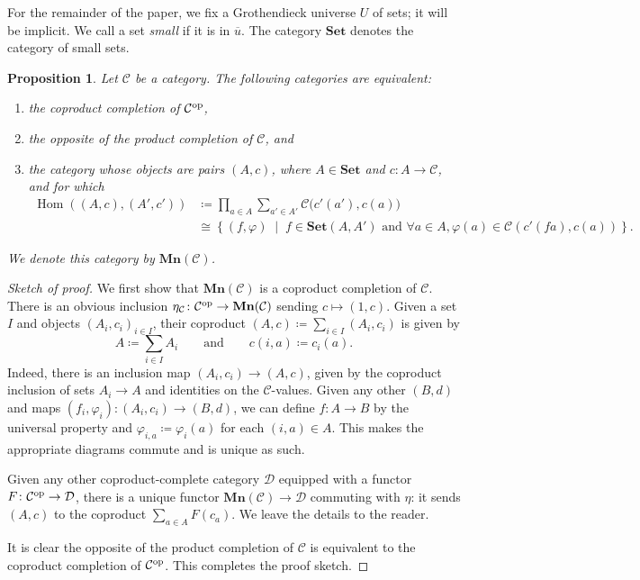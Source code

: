 \documentclass[11pt, one side, article]{memoir}
\theoremstyle{definition}
\theoremstyle{plain}
\newtheorem{proposition}[definitionx]{Proposition}
\DeclareMathOperator{\Hom}{Hom}
\newcommand{\cat}[1]{\mathcal{#1}}%
\newcommand{\Cat}[1]{\mathbf{#1}}%
\newcommand{\op}{^\tn{op}}
\newcommand{\tn}[1]{\textnormal{#1}}
\newcommand{\ol}[1]{\overline{#1}}
\newcommand{\smset}{\Cat{Set}}
\newcommand{\0}{\textsf{0}}
\newcommand{\1}{\tn{\textsf{1}}}
\newcommand{\2}{\tn{\textsf{2}}}
\newcommand{\3}{\tn{\textsf{3}}}
\newcommand{\4}{\tn{\textsf{4}}}
\newcommand{\5}{\tn{\textsf{5}}}
\newcommand{\6}{\tn{\textsf{6}}}
\newcommand{\7}{\tn{\textsf{7}}}
\newcommand{\8}{\tn{\textsf{8}}}
\newcommand{\9}{\tn{\textsf{9}}}
\newcommand{\mn}{\Cat{Mn}}
\newcommand{\qqand}{\qquad\text{and}\qquad}
\begin{document}
For the remainder of the paper, we fix a Grothendieck universe $U$ of sets; it will be implicit. We call a set \emph{small} if it is in $\ol{u}$. The category $\smset$ denotes the category of small sets.

\begin{proposition}
Let $\cat{C}$ be a category. The following categories are equivalent:
\begin{enumerate}
	\item the coproduct completion of $\cat{C}\op$,
	\item the opposite of the product completion of $\cat{C}$, and
	\item the category whose objects are pairs $(A,c)$, where $A\in\smset$ and $c\colon A\to\cat{C}$, and for which
	\begin{align*}
	\Hom((A,c),(A',c'))&\coloneqq\prod_{a\in A}\sum_{a'\in A'}\cat{C}\big(c'(a'),c(a)\big)\\&\cong\left\{(f,\varphi)\;\middle|\; f\in\smset(A,A')\text{ and }\forall a\in A, \varphi(a)\in\cat{C}(c'(fa),c(a))\right\}.
	\end{align*}
\end{enumerate}
We denote this category by $\mn(\cat{C})$.
\end{proposition}
\begin{proof}[Sketch of proof]
We first show that $\mn(\cat{C})$ is a coproduct completion of $\cat{C}$. There is an obvious inclusion $\eta_\cat{C}\colon \cat{C}\op\to\mn(\cat{C})$ sending $c\mapsto (1,c)$. Given a set $I$ and objects $(A_i,c_i)_{i\in I}$, their coproduct $(A,c)\coloneqq\sum_{i\in I}(A_i,c_i)$ is given by
\[
A\coloneqq\sum_{i\in I}A_i
\qqand
c(i,a)\coloneqq c_i(a).
\]
Indeed, there is an inclusion map $(A_i,c_i)\to (A,c)$, given by the coproduct inclusion of sets $A_i\to A$ and identities on the $\cat{C}$-values. Given any other $(B,d)$ and maps $(f_i,\varphi_i)\colon (A_i,c_i)\to(B,d)$, we can define $f\colon A\to B$ by the universal property and $\varphi_{i,a}\coloneqq\varphi_i(a)$ for each $(i,a)\in A$. This makes the appropriate diagrams commute and is unique as such.

Given any other coproduct-complete category $\cat{D}$ equipped with a functor $F\colon\cat{C}\op\to\cat{D}$, there is a unique functor $\mn(\cat{C})\to\cat{D}$ commuting with $\eta$: it sends $(A,c)$ to the coproduct $\sum_{a\in A}F(c_a)$. We leave the details to the reader.

It is clear the opposite of the product completion of $\cat{C}$ is equivalent to the coproduct completion of $\cat{C}\op$. This completes the proof sketch.
\end{proof}
\end{document}
